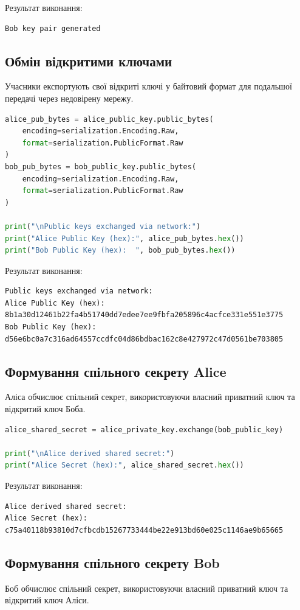 Результат виконання:
\begin{lstlisting}
Bob key pair generated
\end{lstlisting}

\subsection{Обмін відкритими ключами}
Учасники експортують свої відкриті ключі у байтовий формат для подальшої передачі через недовірену мережу.

\begin{lstlisting}[language=Python]
alice_pub_bytes = alice_public_key.public_bytes(
    encoding=serialization.Encoding.Raw,
    format=serialization.PublicFormat.Raw
)
bob_pub_bytes = bob_public_key.public_bytes(
    encoding=serialization.Encoding.Raw,
    format=serialization.PublicFormat.Raw
)

print("\nPublic keys exchanged via network:")
print("Alice Public Key (hex):", alice_pub_bytes.hex())
print("Bob Public Key (hex):  ", bob_pub_bytes.hex())
\end{lstlisting}

Результат виконання:
\begin{lstlisting}
Public keys exchanged via network:
Alice Public Key (hex): 8b1a30d12461b22fa4b51740dd7edee7ee9fbfa205896c4acfce331e551e3775
Bob Public Key (hex):   d56e6bc0a7c316ad64557ccdfc04d86bdbac162c8e427972c47d0561be703805
\end{lstlisting}

\subsection{Формування спільного секрету Alice}
Аліса обчислює спільний секрет, використовуючи власний приватний ключ та відкритий ключ Боба.

\begin{lstlisting}[language=Python]
alice_shared_secret = alice_private_key.exchange(bob_public_key)

print("\nAlice derived shared secret:")
print("Alice Secret (hex):", alice_shared_secret.hex())
\end{lstlisting}

Результат виконання:
\begin{lstlisting}
Alice derived shared secret:
Alice Secret (hex): c75a40118b93810d7cfbcdb15267733444be22e913bd60e025c1146ae9b65665
\end{lstlisting}

\subsection{Формування спільного секрету Bob}
Боб обчислює спільний секрет, використовуючи власний приватний ключ та відкритий ключ Аліси.

